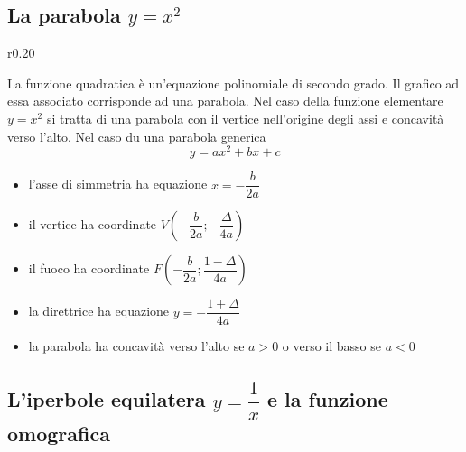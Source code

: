 \documentclass{article}     %
\begin{document}
    \subsection{La parabola $y=x^2$}
        \begin{wrapfigure}[8]{r}{0.20\textwidth}
            \begin{center}
            \end{center}
        \end{wrapfigure}
        La funzione quadratica è un'equazione polinomiale di secondo grado. Il grafico ad essa associato corrisponde ad una parabola. Nel caso della funzione elementare $y=x^2$ si tratta di una parabola con il vertice nell'origine degli assi e concavità verso l'alto. Nel caso du una parabola generica \[y=ax^2+bx+c\]
        \begin{itemize}
            \item l'asse di simmetria ha equazione $x=-\dfrac{b}{2a}$
            \item il vertice ha coordinate $V\left(-\dfrac{b}{2a};-\dfrac{\Delta}{4a}\right)$
            \item il fuoco ha coordinate $F\left(-\dfrac{b}{2a};\dfrac{1-\Delta}{4a}\right)$
            \item la direttrice ha equazione $y=-\dfrac{1+\Delta}{4a}$
            \item la parabola ha concavità verso l'alto se $a>0$ o verso il basso se $a<0$
        \end{itemize}
    \subsection{L'iperbole equilatera $y=\dfrac{1}{x}$ e la funzione omografica}
\end{document}
